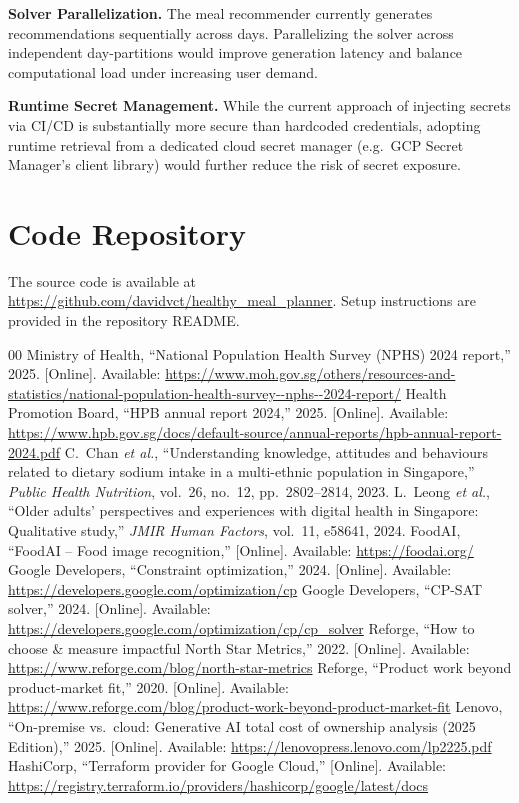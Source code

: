 \documentclass[conference]{IEEEtran}
\begin{document}
\textbf{Solver Parallelization.} The meal recommender currently generates recommendations sequentially across days. Parallelizing the solver across independent day-partitions would improve generation latency and balance computational load under increasing user demand.

\textbf{Runtime Secret Management.} While the current approach of injecting secrets via CI/CD is substantially more secure than hardcoded credentials, adopting runtime retrieval from a dedicated cloud secret manager (e.g.\ GCP Secret Manager's client library) would further reduce the risk of secret exposure.

\section*{Code Repository}
The source code is available at \url{https://github.com/davidvct/healthy_meal_planner}. Setup instructions are provided in the repository README.

\begin{thebibliography}{00}
 Ministry of Health, ``National Population Health Survey (NPHS) 2024 report,'' 2025. [Online]. Available: \url{https://www.moh.gov.sg/others/resources-and-statistics/national-population-health-survey--nphs--2024-report/}
 Health Promotion Board, ``HPB annual report 2024,'' 2025. [Online]. Available: \url{https://www.hpb.gov.sg/docs/default-source/annual-reports/hpb-annual-report-2024.pdf}
 C.~Chan \textit{et al.}, ``Understanding knowledge, attitudes and behaviours related to dietary sodium intake in a multi-ethnic population in Singapore,'' \textit{Public Health Nutrition}, vol.~26, no.~12, pp.~2802--2814, 2023.
 L.~Leong \textit{et al.}, ``Older adults' perspectives and experiences with digital health in Singapore: Qualitative study,'' \textit{JMIR Human Factors}, vol.~11, e58641, 2024.
 FoodAI, ``FoodAI -- Food image recognition,'' [Online]. Available: \url{https://foodai.org/}
 Google Developers, ``Constraint optimization,'' 2024. [Online]. Available: \url{https://developers.google.com/optimization/cp}
 Google Developers, ``CP-SAT solver,'' 2024. [Online]. Available: \url{https://developers.google.com/optimization/cp/cp_solver}
 Reforge, ``How to choose \& measure impactful North Star Metrics,'' 2022. [Online]. Available: \url{https://www.reforge.com/blog/north-star-metrics}
 Reforge, ``Product work beyond product-market fit,'' 2020. [Online]. Available: \url{https://www.reforge.com/blog/product-work-beyond-product-market-fit}
 Lenovo, ``On-premise vs.\ cloud: Generative AI total cost of ownership analysis (2025 Edition),'' 2025. [Online]. Available: \url{https://lenovopress.lenovo.com/lp2225.pdf}
 HashiCorp, ``Terraform provider for Google Cloud,'' [Online]. Available: \url{https://registry.terraform.io/providers/hashicorp/google/latest/docs}
\end{thebibliography}
\end{document}
